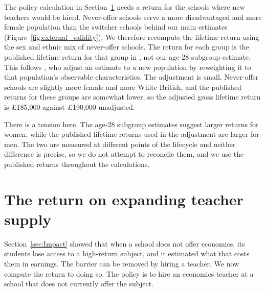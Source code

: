 The policy calculation in Section~\ref{sec:Policy} needs a return for the schools where new teachers would be hired. Never-offer schools serve a more disadvantaged and more female population than the switcher schools behind our main estimates (Figure~\ref{fig:external_validity}). We therefore recompute the lifetime return using the sex and ethnic mix of never-offer schools. The return for each group is the published lifetime return for that group in \citet{britton2026lifetime}, not our age-28 subgroup estimate. This follows \citet{angrist2013extrapolate}, who adjust an estimate to a new population by reweighting it to that population's observable characteristics. The adjustment is small. Never-offer schools are slightly more female and more White British, and the published returns for these groups are somewhat lower, so the adjusted gross lifetime return is \pounds 185,000 against \pounds 190,000 unadjusted.

There is a tension here. The age-28 subgroup estimates suggest larger returns for women, while the published lifetime returns used in the adjustment are larger for men. The two are measured at different points of the lifecycle and neither difference is precise, so we do not attempt to reconcile them, and we use the published returns throughout the calculations.


\section{The return on expanding teacher supply}
\label{sec:Policy}

Section~\ref{sec:Impact} showed that when a school does not offer economics, its students lose access to a high-return subject, and it estimated what that costs them in earnings. The barrier can be removed by hiring a teacher. We now compute the return to doing so. The policy is to hire an economics teacher at a school that does not currently offer the subject.

